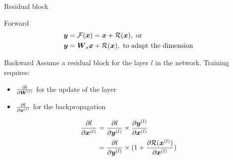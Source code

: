 \begin{frame}{Residual block}
  \begin{block}{Forward}
    \begin{align*}
      \boldsymbol{y} &= \mathcal{F}(\boldsymbol{x}) = \boldsymbol{x} + \mathcal{R}(\boldsymbol{x}), \textrm{ or }\\
      \boldsymbol{y} &= \boldsymbol{W}_{s} \boldsymbol{x} + \mathcal{R}(\boldsymbol{x}), \textrm{ to adapt the dimension}
    \end{align*}
  \end{block}
  \begin{block}{Backward}
    Assume a residual block for the layer $l$ in the network. Training requires:
    \begin{itemize}
    \item $\frac{\partial l }{\partial\boldsymbol{W}^{(l)}}$ for the update of the layer
    \item $\frac{\partial l }{\partial\boldsymbol{x}^{(l)}}$ for the backpropagation
    \end{itemize}
    \begin{align*}
      \frac{\partial l }{\partial\boldsymbol{x}^{(l)}} &=       \frac{\partial l }{\partial\boldsymbol{y}^{(l)}} \times  \frac{\partial\boldsymbol{y}^{(l)}}{\partial\boldsymbol{x}^{(l)}}\\
                                            &= \frac{\partial l }{\partial\boldsymbol{y}^{(l)}} \times  (1+\frac{\partial\mathcal{R}(\boldsymbol{x}^{(l)})}{\partial\boldsymbol{x}^{(l)}})
    \end{align*}
  \end{block}
\end{frame}
